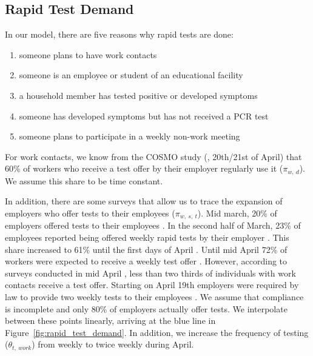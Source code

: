 \subsection{Rapid Test Demand}
\label{subsec:rapid_test_demand}

In our model, there are five reasons why rapid tests are done:

\begin{enumerate}
    \item someone plans to have work contacts
    \item someone is an employee or student of an educational facility
    \item a household member has tested positive or developed symptoms
    \item someone has developed symptoms but has not received a PCR test
    \item someone plans to participate in a weekly non-work meeting
\end{enumerate}


For work contacts, we know from the COSMO study (\cite{Betsch2021}, 20th/21st of April)
that 60\% of workers who receive a test offer by their employer regularly use it
($\pi_{w,\:d}$). We assume this share to be time constant.

In addition, there are some surveys that allow us to trace the expansion of employers who
offer tests to their employees ($\pi_{w,\:s,\:t}$). Mid march, 20\% of employers offered
tests to their employees \citep{DIHK2021}. In the second half of March, 23\% of employees
reported being offered weekly rapid tests by their employer \citep{Ahlers2021}. This
share increased to 61\% until the first days of April \citep{BMWI2021, IZA2021}. Until
mid April 72\% of workers were expected to receive a weekly test offer \citep{BMWI2021,
IZA2021}. However, according to surveys conducted in mid April \citep{Betsch2021}, less
than two thirds of individuals with work contacts receive a test offer. Starting on April
19th employers were required by law to provide two weekly tests to their employees
\citep{Bundesanzeiger2021}. We assume that compliance is incomplete and only 80\% of
employers actually offer tests. We interpolate between these points linearly, arriving at
the blue line in Figure~\ref{fig:rapid_test_demand}. In addition, we increase the
frequency of testing ($\theta_{t,\:work}$) from weekly to twice weekly during April.

